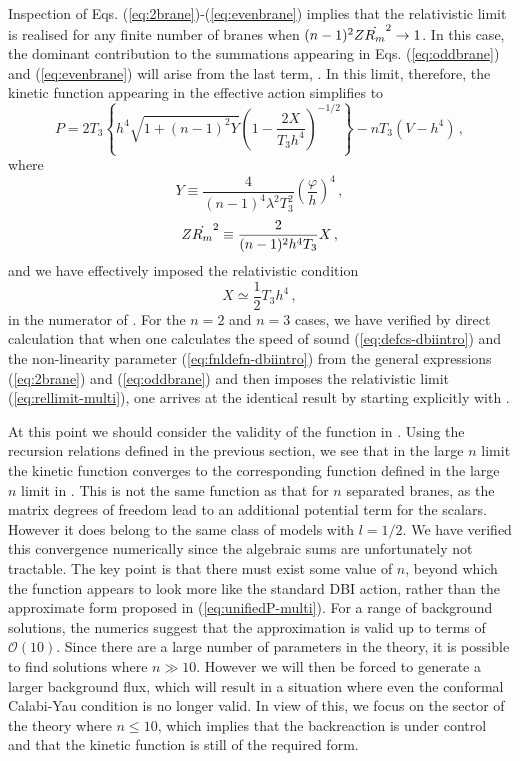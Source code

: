 Inspection of Eqs. (\ref{eq:2brane})-(\ref{eq:evenbrane}) implies that 
the relativistic limit is realised for any finite number of branes when 
$(n-1)^2 Z\dot{R_m}^2 \rightarrow 1$. In this case, the dominant contribution 
to the summations appearing in Eqs. (\ref{eq:oddbrane}) and (\ref{eq:evenbrane})
will arise from the last term, . In this limit, 
therefore, the kinetic function appearing in the effective action simplifies to 
% 
\begin{equation}
\label{eq:unifiedP-multi}
P = 2T_3 \left\{ h^4 \sqrt{1+(n-1)^2Y} 
\left( 1- \frac{2X}{T_3h^4} \right)^{-1/2} 
 \right\} - n T_3 \left(V - h^4 \right) \,,
\end{equation}
% 
where 
% 
\begin{equation}
\label{eq:defY-multi}
Y \equiv \frac{4}{(n-1)^4 \lambda^2 T_3^2} \left( \frac{\varphi}{h} \right)^4 \,,
\end{equation}
% 
\begin{equation}
\label{eq:defXR2-multi}
Z\dot{R_m}^2 \equiv \frac{2}{(n-1)^2 h^4 T_3}X \,,
\end{equation} 
% 
and we have effectively imposed the relativistic condition 
% 
\begin{equation}
\label{eq:rellimit-multi}
X \simeq \frac{1}{2} T_3 h^4 \,,
\end{equation}
% 
in the numerator of .  
For the $n=2$ and $n=3$ cases, we have verified by direct 
calculation that when one calculates the speed of sound 
(\ref{eq:defcs-dbiintro}) and the non-linearity parameter 
(\ref{eq:fnldefn-dbiintro}) from the general expressions (\ref{eq:2brane}) and (\ref{eq:oddbrane}) 
and then imposes the relativistic
limit (\ref{eq:rellimit-multi}), one arrives at the identical result 
by starting explicitly with .


At this point we should consider the validity of 
the function in . Using the
recursion relations defined in the previous section, 
we see that in the large $n$ limit the kinetic function converges to 
the corresponding function defined in the large $n$ 
limit in \cite{thomasward}. This is not the same function as that for
$n$ separated branes, as the matrix degrees of freedom 
lead to an additional potential term for the scalars. However it does belong
to the same class of models with $l=1/2$. We have 
verified this convergence numerically since the algebraic sums are
unfortunately not tractable. The key point is that there must exist some 
value of $n$, beyond which the function appears to look
more like the standard DBI action, rather than the 
approximate form proposed in (\ref{eq:unifiedP-multi}). For a range of background 
solutions, the numerics suggest that the approximation is 
valid up to terms of $\mathcal{O}(10)$. Since there are a large number of 
parameters in the theory, it is possible to find solutions 
where $n \gg 10$. However we will then be forced to 
generate a larger background flux, which will result 
in a situation where even the conformal 
Calabi-Yau condition is no longer valid. In view of this, we focus on
the sector of the theory where $n \le 10$, which implies that the 
backreaction is under control and that the kinetic function
is still of the required form. 


